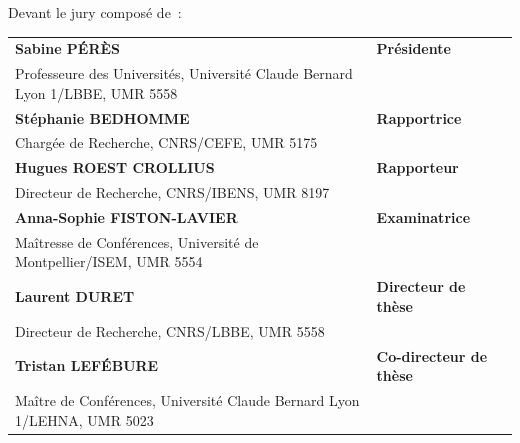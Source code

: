 \hspace{-1.7cm}
Devant le jury composé de~:\\

\hspace{-2cm}
\small {
\begin{tabular}{ll}
    \textbf{Sabine PÉRÈS} & \textbf{Présidente}         \\  \vspace*{3pt}
    Professeure des Universités, Université Claude Bernard Lyon 1/LBBE, UMR 5558 \\
    \textbf{Stéphanie BEDHOMME}     & \textbf{Rapportrice}         \\ \vspace*{3pt}
    Chargée de Recherche, CNRS/CEFE, UMR 5175 \\
    \textbf{Hugues ROEST CROLLIUS}       & \textbf{Rapporteur}         \\ \vspace*{3pt}
    Directeur de Recherche, CNRS/IBENS, UMR 8197 \\
    \textbf{Anna-Sophie FISTON-LAVIER}      & \textbf{Examinatrice}        \\\vspace*{3pt}
    Maîtresse de Conférences, Université de Montpellier/ISEM, UMR 5554 \\
    \textbf{Laurent DURET}       & \textbf{Directeur de thèse}\\  \vspace*{3pt}
    Directeur de Recherche, CNRS/LBBE, UMR 5558 \\ 
    \textbf{Tristan LEFÉBURE}       & \textbf{Co-directeur de thèse} \\  \vspace*{3pt}
    Maître de Conférences, Université Claude Bernard Lyon 1/LEHNA, UMR 5023 \\
\end{tabular}
}
